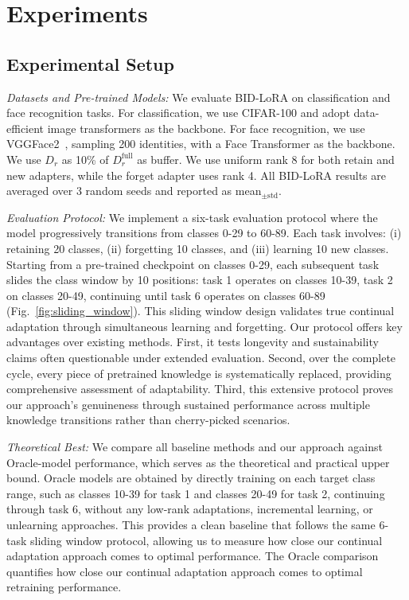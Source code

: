 \section{Experiments}
\label{5.0}
\subsection{Experimental Setup}
\medskip
\noindent
\textit{Datasets and Pre-trained Models:} We evaluate BID-LoRA on classification and face recognition tasks. For classification, we use CIFAR-100 \cite{krizhevsky2009learning} and adopt data-efficient image transformers \cite{touvron2021training} as the backbone. For face recognition, we use VGGFace2~\cite{cao2018vggface2}, sampling 200 identities, with a Face Transformer \cite{zhong2021face} as the backbone. We use $D_r$ as 10\% of $D^\text{full}_r$ as buffer. We use uniform rank 8 for both retain and new adapters, while the forget adapter uses rank 4. All BID-LoRA results are averaged over 3 random seeds and reported as mean$_{\pm\text{std}}$.

\medskip
\noindent
\textit{Evaluation Protocol:} We implement a six-task evaluation protocol where the model progressively transitions from classes 0-29 to 60-89. Each task involves: (i) retaining 20 classes, (ii) forgetting 10 classes, and (iii) learning 10 new classes. Starting from a pre-trained checkpoint on classes 0-29, each subsequent task slides the class window by 10 positions: task 1 operates on classes 10-39, task 2 on classes 20-49, continuing until task 6 operates on classes 60-89 (Fig.~\ref{fig:sliding_window}). This sliding window design validates true continual adaptation through simultaneous learning and forgetting. Our protocol offers key advantages over existing methods. First, it tests longevity and sustainability claims often questionable under extended evaluation. Second, over the complete cycle, every piece of pretrained knowledge is systematically replaced, providing comprehensive assessment of adaptability. Third, this extensive protocol proves our approach's genuineness through sustained performance across multiple knowledge transitions rather than cherry-picked scenarios.

\medskip
\noindent
\textit{Theoretical Best:} We compare all baseline methods and our approach against Oracle-model performance, which serves as the theoretical and practical upper bound. Oracle models are obtained by directly training on each target class range, such as classes 10-39 for task 1 and classes 20-49 for task 2, continuing through task 6, without any low-rank adaptations, incremental learning, or unlearning approaches. This provides a clean baseline that follows the same 6-task sliding window protocol, allowing us to measure how close our continual adaptation approach comes to optimal performance. The Oracle comparison quantifies how close our continual adaptation approach comes to optimal retraining performance.

